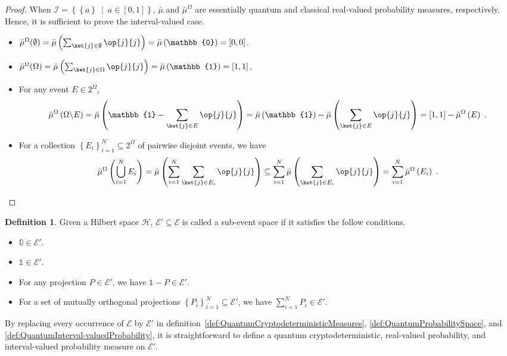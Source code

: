 \documentclass[12pt]{iopart}
\theoremstyle{plain}
\theoremstyle{definition}
\newtheorem{definition}[thm]{Definition}
\theoremstyle{remark}
\newcommand{\Hilb}{\mathcal{H}}
\newcommand{\events}{\ensuremath{\mathcal{E}}}
\newcommand{\proj}[1]{\op{#1}{#1}}
\newcommand{\set}[2]{\ensuremath{\left\{ {#1}~\middle|~{#2}\right\} }}
\begin{document}
\begin{proof}When $\mathscr{I}=\set{\left\{ a\right\} }{a\in\left[0,1\right]}$,
$\bar{\mu}$ and $\bar{\mu}^{\Omega}$ are essentially quantum and
classical real-valued probability measures, respectively. Hence, it
is sufficient to prove the interval-valued case.
\begin{itemize}
\item $\bar{\mu}^{\Omega}(\emptyset)=\bar{\mu}\left(\sum_{\ket{j}\in\emptyset}\proj{j}\right)=\bar{\mu}\left(\mathbb{0}\right)=[0,0]$. 
\item $\bar{\mu}^{\Omega}(\Omega)=\bar{\mu}\left(\sum_{\ket{j}\in\Omega}\proj{j}\right)=\bar{\mu}\left(\mathbb{1}\right)=[1,1]$. 
\item For any event $E\in2^{\Omega}$,
\begin{equation}
\bar{\mu}^{\Omega}\left(\Omega\backslash E\right)=\bar{\mu}\left(\mathbb{1}-\sum_{\ket{j}\in E}\proj{j}\right)=\bar{\mu}\left(\mathbb{1}\right)-\bar{\mu}\left(\sum_{\ket{j}\in E}\proj{j}\right)=\left[1,1\right]-\bar{\mu}^{\Omega}\left(E\right)\textrm{ .}
\end{equation}
\item For a collection $\left\{ E_{i}\right\} _{i=1}^{N}\subseteq2^{\Omega}$
of pairwise disjoint events, we have
\begin{equation}
\bar{\mu}^{\Omega}\left(\bigcup_{i=1}^{N}E_{i}\right)=\bar{\mu}\left(\sum_{i=1}^{N}\sum_{\ket{j}\in E_{i}}\proj{j}\right)\subseteq\sum_{i=1}^{N}\bar{\mu}\left(\sum_{\ket{j}\in E_{i}}\proj{j}\right)=\sum_{i=1}^{N}\bar{\mu}^{\Omega}\left(E_{i}\right)\textrm{ .}
\end{equation}
\end{itemize}
\end{proof}

\begin{definition}\label{def:sub-event-space}Given a Hilbert space
$\Hilb$, $\events'\subseteq\events$ is called a sub-event space
if it satisfies the follow conditions.
\begin{itemize}
\item $\mathbb{0}\in\events'$.
\item $\mathbb{1}\in\events'$.
\item For any projection $P\in\events'$, we have $\mathbb{1}-P\in\events'$.
\item For a set of mutually orthogonal projections $\left\{ P_{i}\right\} _{i=1}^{N}\subseteq\events'$,
we have $\sum_{i=1}^{N}P_{i}\in\events'$.
\end{itemize}
By replacing every occurrence of $\events$ by $\events'$ in definition~\ref{def:QuantumCryptodeterministicMeasures},
\ref{def:QuantumProbabilitySpace}, and \ref{def:QuantumInterval-valuedProbability},
it is straightforward to define a quantum cryptodeterministic, real-valued
probability, and interval-valued probability measure on $\events'$.\end{definition}
\end{document}
